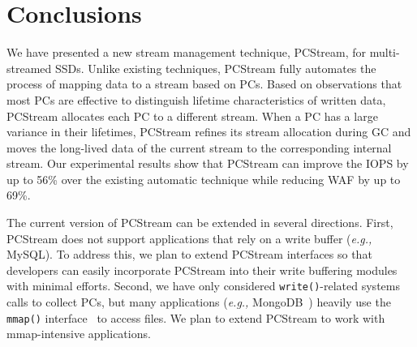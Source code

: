 \vspace{-10pt}
\section{Conclusions}
\vspace{-5pt}

We have presented a new stream management technique, \textsf{\small PCStream},
for multi-streamed SSDs.  Unlike existing techniques, \textsf{\small PCStream}
fully automates the process of mapping data to a stream based on PCs.  Based on
observations that most PCs are effective to distinguish lifetime
characteristics of written data, \textsf{\small PCStream} allocates each PC to
a different stream.  When a PC has a large variance in their lifetimes,
\textsf{\small PCStream} refines its stream allocation during GC and moves the
long-lived data of the current stream to the corresponding internal stream.
Our experimental results show that \textsf{\small PCStream} can improve the
IOPS by up to 56\% over the existing automatic technique while reducing WAF by
up to 69\%. 

The current version of \textsf{\small PCStream} can be extended in several
directions.  First, \textsf{\small PCStream} does not support applications that rely
on a write buffer ({\it e.g.,} MySQL). To address this, we plan to extend
\textsf{\small PCStream} interfaces so that developers can easily 
incorporate \textsf{\small PCStream} into
their write buffering modules with minimal efforts.  Second, we have only
considered \texttt{write()}-related systems calls to collect PCs, but many
applications ({\it e.g.,} MongoDB~\cite{MongoDB}) heavily use 
the \texttt{mmap()} interface~\cite{mmap} to access files. 
We plan to extend \textsf{\small PCStream} to work with mmap-intensive applications. 

